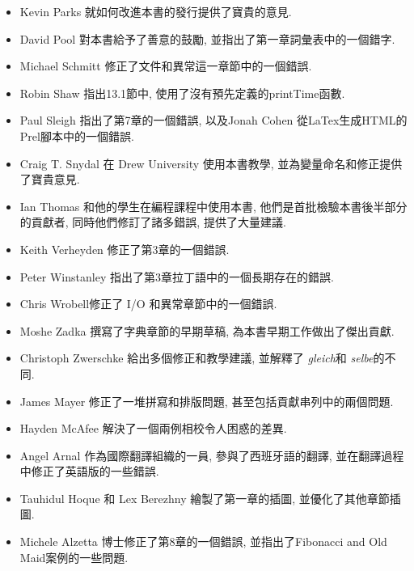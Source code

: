 \documentclass[10pt]{book}
\begin{document}
\begin{itemize}
\item Kevin Parks 就如何改進本書的發行提供了寶貴的意見. 

\item David Pool 對本書給予了善意的鼓勵, 並指出了第一章詞彙表中的一個錯字. 

\item Michael Schmitt 修正了文件和異常這一章節中的一個錯誤. 

\item Robin Shaw 指出13.1節中, 使用了沒有預先定義的printTime函數. 

\item Paul Sleigh 指出了第7章的一個錯誤, 
以及Jonah Cohen 從LaTex生成HTML的Prel腳本中的一個錯誤. 

\item Craig T. Snydal 在 Drew University 使用本書教學, 
並為變量命名和修正提供了寶貴意見. 

\item Ian Thomas 和他的學生在編程課程中使用本書, 
他們是首批檢驗本書後半部分的貢獻者, 同時他們修訂了諸多錯誤, 提供了大量建議. 

\item Keith Verheyden 修正了第3章的一個錯誤. 

\item Peter Winstanley 指出了第3章拉丁語中的一個長期存在的錯誤. 

\item Chris Wrobell修正了 I/O 和異常章節中的一個錯誤. 

\item Moshe Zadka 撰寫了字典章節的早期草稿, 為本書早期工作做出了傑出貢獻. 

\item Christoph Zwerschke 給出多個修正和教學建議, 並解釋了
 {\em gleich}和 {\em selbe}的不同. 

\item James Mayer 修正了一堆拼寫和排版問題, 甚至包括貢獻串列中的兩個問題. 

\item Hayden McAfee 解決了一個兩例相校令人困惑的差異. 

\item Angel Arnal 作為國際翻譯組織的一員, 參與了西班牙語的翻譯, 
並在翻譯過程中修正了英語版的一些錯誤. 

\item Tauhidul Hoque 和 Lex Berezhny 繪製了第一章的插圖, 並優化了其他章節插圖. 

\item Michele Alzetta 博士修正了第8章的一個錯誤, 
並指出了Fibonacci and Old Maid案例的一些問題. 


\end{itemize}
\end{document}
